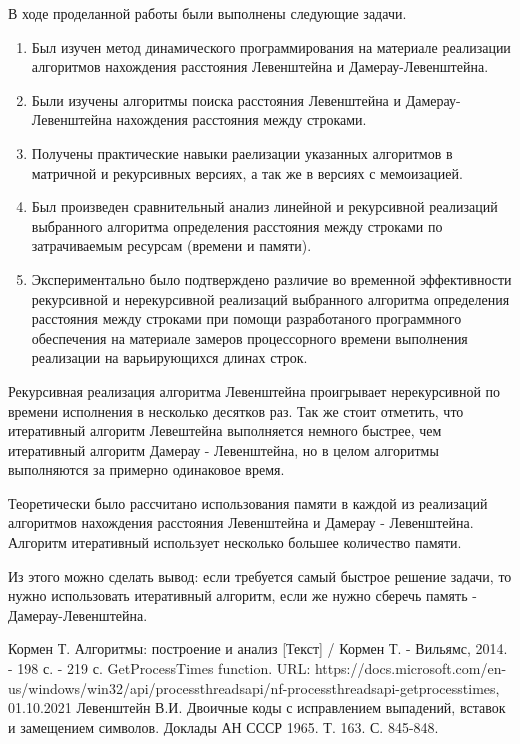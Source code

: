 \documentclass[12pt]{report}
\begin{document}
В ходе проделанной работы были выполнены следующие задачи.
\begin{enumerate}
    \item Был изучен метод динамического программирования на материале реализации алгоритмов нахождения расстояния Левенштейна и Дамерау-Левенштейна.
    \item Были изучены алгоритмы поиска расстояния Левенштейна и Дамерау-Левенштейна нахождения расстояния между строками.
    \item Получены практические навыки раелизации указанных алгоритмов в матричной и рекурсивных версиях, а так же в версиях с мемоизацией.
    \item Был произведен сравнительный анализ линейной и рекурсивной реализаций выбранного алгоритма определения расстояния между строками по затрачиваемым ресурсам (времени и памяти).
    \item Экспериментально было подтверждено различие во временной эффективности рекурсивной и нерекурсивной реализаций выбранного алгоритма определения расстояния между строками при помощи разработаного программного обеспечения на материале замеров процессорного времени выполнения реализации на варьирующихся длинах строк. 
\end{enumerate}

Рекурсивная реализация алгоритма Левенштейна проигрывает нерекурсивной по времени исполнения в несколько десятков раз. Так же стоит отметить, что итеративный алгоритм Левештейна выполняется немного быстрее, чем итеративный алгоритм Дамерау - Левенштейна, но в целом алгоритмы выполняются за примерно одинаковое время.

Теоретически было рассчитано использования памяти в каждой из реализаций алгоритмов нахождения расстояния Левенштейна и Дамерау - Левенштейна. Алгоритм итеративный использует несколько большее количество памяти.

Из этого можно сделать вывод: если требуется самый быстрое решение задачи, то нужно использовать итеративный алгоритм, если же нужно сберечь память - Дамерау-Левенштейна.
\newpage
{}
\begin{thebibliography}{}
Кормен Т. Алгоритмы: построение и анализ [Текст] / Кормен Т. - Вильямс, 2014. - 198 с. - 219 с.
GetProcessTimes function. URL: https://docs.microsoft.com/en-us/windows/win32/api/processthreadsapi/nf-processthreadsapi-getprocesstimes, 01.10.2021
Левенштейн В.И. Двоичные коды с исправлением выпадений, вставок и замещением символов. Доклады АН СССР 1965. Т. 163. С. 845-848.
\end{thebibliography}
	

\end{document}

